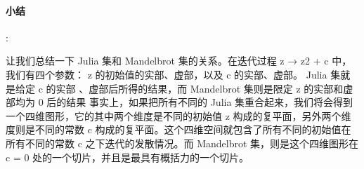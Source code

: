 \documentclass{article}
\begin{document}
    

    \paragraph{小结}:\par 
    让我们总结一下 Julia 集和 Mandelbrot 集的关系。在迭代过程 z → z2 + c 中，
    我们有四个参数： z 的初始值的实部、虚部，以及 c 的实部、虚部。 Julia 集就是给定 c 的实部
    、虚部后所得的结果，而 Mandelbrot 集则是限定 z 的实部和虚部均为 0 后的结果
    事实上，如果把所有不同的 Julia 集重合起来，我们将会得到一个四维图形，它的其中两个维度是不同的初始值
     z 构成的复平面，另外两个维度则是不同的常数 c 构成的复平面。这个四维空间就包含了所有不同的初始值在所有不同的常数
      c 之下迭代的发散情况。而 Mandelbrot 集，则是这个四维图形在 c = 0 处的一个切片，并且是最具有概括力的一个切片。
    \cite{second}






\end{document}
